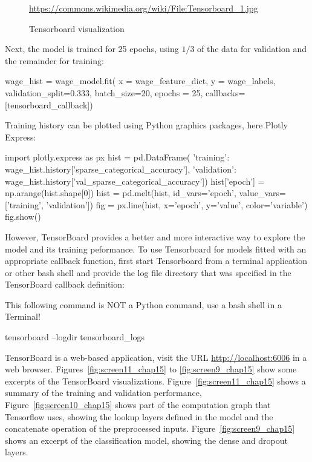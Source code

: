 \begin{withcode}
\begin{figure}
\scriptsize \url{https://commons.wikimedia.org/wiki/File:Tensorboard_1.jpg}
\caption{Tensorboard visualization}
\label{fig:tensorboard}
\end{figure}

Next, the model is trained for 25 epochs, using $1/3$ of the data for validation and the remainder for training:

\begin{pythoncode}
wage_hist = wage_model.fit(
    x = wage_feature_dict,
    y = wage_labels,
    validation_split=0.333,
    batch_size=20,
    epochs = 25,
    callbacks=[tensorboard_callback])
\end{pythoncode}

Training history can be plotted using Python graphics packages, here Plotly Express:

\begin{pythoncode}
import plotly.express as px
hist = pd.DataFrame({
    'training': 
        wage_hist.history['sparse_categorical_accuracy'],
    'validation': 
        wage_hist.history['val_sparse_categorical_accuracy']})
hist['epoch'] = np.arange(hist.shape[0])
hist = pd.melt(hist, id_vars='epoch', 
                     value_vars=['training', 'validation'])
fig = px.line(hist, x='epoch', y='value', color='variable')
fig.show()
\end{pythoncode}

However, TensorBoard provides a better and more interactive way to explore the model and its training peformance. To use Tensorboard for models fitted with an appropriate callback function, first start Tensorboard from a terminal application or other bash shell and provide the log file directory that was specified in the TensorBoard callback definition:

\begin{alertbox}
\small
This following command is NOT a Python command, use a bash shell in a Terminal!
\normalsize
\end{alertbox}

\begin{bashcode}
tensorboard --logdir tensorboard_logs
\end{bashcode}

\noindent TensorBoard is a web-based application, visit the URL \url{http://localhost:6006} in a web browser. Figures~\ref{fig:screen11_chap15} to \ref{fig:screen9_chap15} show some excerpts of the TensorBoard visualizations. Figure~\ref{fig:screen11_chap15} shows a summary of the training and validation performance, Figure~\ref{fig:screen10_chap15} shows part of the computation graph that Tensorflow uses, showing the lookup layers defined in the model and the concatenate operation of the preprocessed inputs. Figure~\ref{fig:screen9_chap15} shows an excerpt of the classification model, showing the dense and dropout layers.


\end{withcode}
